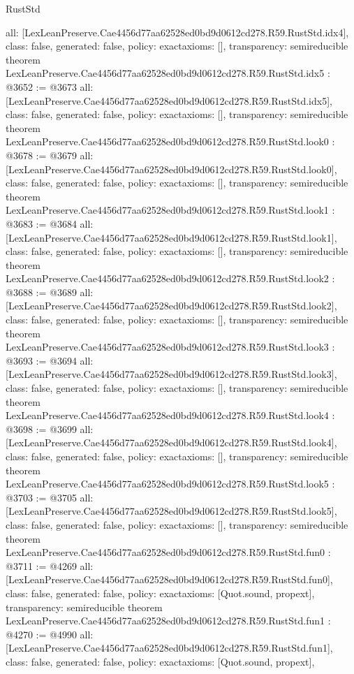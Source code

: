\begin{lexlean}{RustStd}
\begin{coremodule}
{  all: [LexLeanPreserve.Cae4456d77aa62528ed0bd9d0612cd278.R59.RustStd.idx4],
  class: false,
  generated: false,
  policy: exact{axioms: []},
  transparency: semireducible
}
theorem LexLeanPreserve.Cae4456d77aa62528ed0bd9d0612cd278.R59.RustStd.idx5 : @3652 := @3673 {
  all: [LexLeanPreserve.Cae4456d77aa62528ed0bd9d0612cd278.R59.RustStd.idx5],
  class: false,
  generated: false,
  policy: exact{axioms: []},
  transparency: semireducible
}
theorem LexLeanPreserve.Cae4456d77aa62528ed0bd9d0612cd278.R59.RustStd.look0 : @3678 := @3679 {
  all: [LexLeanPreserve.Cae4456d77aa62528ed0bd9d0612cd278.R59.RustStd.look0],
  class: false,
  generated: false,
  policy: exact{axioms: []},
  transparency: semireducible
}
theorem LexLeanPreserve.Cae4456d77aa62528ed0bd9d0612cd278.R59.RustStd.look1 : @3683 := @3684 {
  all: [LexLeanPreserve.Cae4456d77aa62528ed0bd9d0612cd278.R59.RustStd.look1],
  class: false,
  generated: false,
  policy: exact{axioms: []},
  transparency: semireducible
}
theorem LexLeanPreserve.Cae4456d77aa62528ed0bd9d0612cd278.R59.RustStd.look2 : @3688 := @3689 {
  all: [LexLeanPreserve.Cae4456d77aa62528ed0bd9d0612cd278.R59.RustStd.look2],
  class: false,
  generated: false,
  policy: exact{axioms: []},
  transparency: semireducible
}
theorem LexLeanPreserve.Cae4456d77aa62528ed0bd9d0612cd278.R59.RustStd.look3 : @3693 := @3694 {
  all: [LexLeanPreserve.Cae4456d77aa62528ed0bd9d0612cd278.R59.RustStd.look3],
  class: false,
  generated: false,
  policy: exact{axioms: []},
  transparency: semireducible
}
theorem LexLeanPreserve.Cae4456d77aa62528ed0bd9d0612cd278.R59.RustStd.look4 : @3698 := @3699 {
  all: [LexLeanPreserve.Cae4456d77aa62528ed0bd9d0612cd278.R59.RustStd.look4],
  class: false,
  generated: false,
  policy: exact{axioms: []},
  transparency: semireducible
}
theorem LexLeanPreserve.Cae4456d77aa62528ed0bd9d0612cd278.R59.RustStd.look5 : @3703 := @3705 {
  all: [LexLeanPreserve.Cae4456d77aa62528ed0bd9d0612cd278.R59.RustStd.look5],
  class: false,
  generated: false,
  policy: exact{axioms: []},
  transparency: semireducible
}
theorem LexLeanPreserve.Cae4456d77aa62528ed0bd9d0612cd278.R59.RustStd.fun0 : @3711 := @4269 {
  all: [LexLeanPreserve.Cae4456d77aa62528ed0bd9d0612cd278.R59.RustStd.fun0],
  class: false,
  generated: false,
  policy: exact{axioms: [Quot.sound, propext]},
  transparency: semireducible
}
theorem LexLeanPreserve.Cae4456d77aa62528ed0bd9d0612cd278.R59.RustStd.fun1 : @4270 := @4990 {
  all: [LexLeanPreserve.Cae4456d77aa62528ed0bd9d0612cd278.R59.RustStd.fun1],
  class: false,
  generated: false,
  policy: exact{axioms: [Quot.sound, propext]},
}
\end{coremodule}
\end{lexlean}
